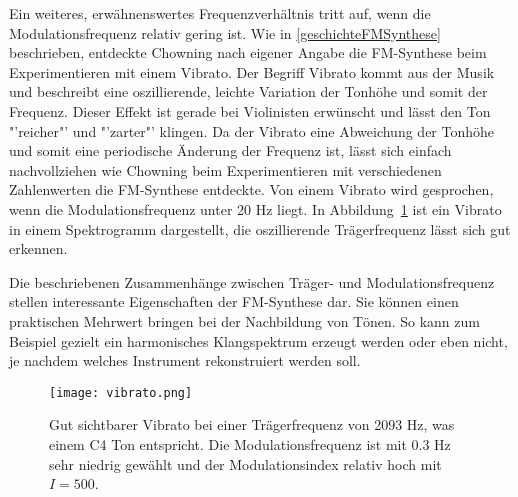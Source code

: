 Ein weiteres, erwähnenswertes Frequenzverhältnis tritt auf, wenn die Modulationsfrequenz relativ gering ist.
Wie in \glqq \ref{geschichteFMSynthese} \grqq{} beschrieben, entdeckte Chowning nach eigener Angabe die FM-Synthese beim Experimentieren mit einem Vibrato. Der Begriff Vibrato kommt aus der Musik und beschreibt eine oszillierende, leichte Variation der Tonhöhe und somit der Frequenz. Dieser Effekt ist gerade bei Violinisten erwünscht und lässt den Ton "'reicher"' und "'zarter"' klingen. \cite[S. 422]{tobias} Da der Vibrato eine Abweichung der Tonhöhe und somit eine periodische Änderung der Frequenz ist, lässt sich einfach nachvollziehen wie Chowning beim Experimentieren mit verschiedenen Zahlenwerten die FM-Synthese entdeckte. Von einem Vibrato wird gesprochen, wenn die Modulationsfrequenz unter 20 Hz liegt. In Abbildung~\ref{fig:vibrato} ist ein Vibrato in einem Spektrogramm dargestellt, die oszillierende Trägerfrequenz lässt sich gut erkennen.

Die beschriebenen Zusammenhänge zwischen Träger- und Modulationsfrequenz stellen interessante Eigenschaften der FM-Synthese dar. Sie können einen praktischen Mehrwert bringen bei der Nachbildung von Tönen. So kann zum Beispiel gezielt ein harmonisches Klangspektrum erzeugt werden oder eben nicht, je nachdem welches Instrument rekonstruiert werden soll.

\begin{figure} [ht]
\centering
  \texttt{[image: vibrato.png]}
\caption{Gut sichtbarer Vibrato bei einer Trägerfrequenz von 2093 Hz, was einem C4 Ton entspricht. Die Modulationsfrequenz ist mit 0.3 Hz sehr niedrig gewählt und der Modulationsindex relativ hoch mit $I=500$.}
\label{fig:vibrato}
\end{figure}




\FloatBarrier 